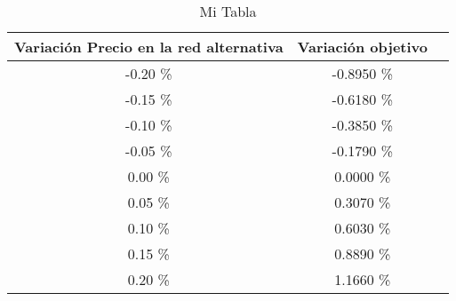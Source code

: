 \begin{table}
\centering
\begin{tabular}{|c|c|c|}
\hline
 Variación Precio en la red alternativa & Variación objetivo \\ \hline
-0.20 \% & -0.8950 \% \\ \hline
-0.15 \% & -0.6180 \% \\ \hline
-0.10 \% & -0.3850 \% \\ \hline
-0.05 \% & -0.1790 \% \\ \hline
0.00 \% & 0.0000 \% \\ \hline
0.05 \% & 0.3070 \% \\ \hline
0.10 \% & 0.6030 \% \\ \hline
0.15 \% & 0.8890 \% \\ \hline
0.20 \% & 1.1660 \% \\ \hline
\end{tabular}
\caption{Mi Tabla}
\end{table}
